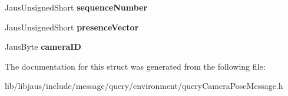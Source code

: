 \begin{DoxyCompactItemize}
\item 
\hypertarget{struct_query_camera_pose_message_struct_ad7e9a81696a85cc403515474f16bd37a}{\-Jaus\-Unsigned\-Short {\bfseries sequence\-Number}}\label{struct_query_camera_pose_message_struct_ad7e9a81696a85cc403515474f16bd37a}

\item 
\hypertarget{struct_query_camera_pose_message_struct_a8a5187ee51df08d5b80f587a44efdb73}{\-Jaus\-Unsigned\-Short {\bfseries presence\-Vector}}\label{struct_query_camera_pose_message_struct_a8a5187ee51df08d5b80f587a44efdb73}

\item 
\hypertarget{struct_query_camera_pose_message_struct_a90c5b59e8b38786443c4e2c777bf4e5c}{\-Jaus\-Byte {\bfseries camera\-I\-D}}\label{struct_query_camera_pose_message_struct_a90c5b59e8b38786443c4e2c777bf4e5c}

\end{DoxyCompactItemize}


\-The documentation for this struct was generated from the following file\-:\begin{DoxyCompactItemize}
\item 
lib/libjaus/include/message/query/environment/query\-Camera\-Pose\-Message.\-h\end{DoxyCompactItemize}

